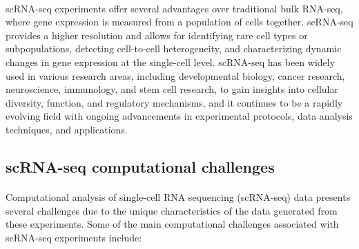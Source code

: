 \documentclass[12pt]{extarticle}
\begin{document}
\paragraph{} scRNA-seq experiments offer several advantages over traditional bulk RNA-seq, where gene expression is measured from a population of cells together. scRNA-seq provides a higher resolution and allows for identifying rare cell types or subpopulations, detecting cell-to-cell heterogeneity, and characterizing dynamic changes in gene expression at the single-cell level. scRNA-seq has been widely used in various research areas, including developmental biology, cancer research, neuroscience, immunology, and stem cell research, to gain insights into cellular diversity, function, and regulatory mechanisms, and it continues to be a rapidly evolving field with ongoing advancements in experimental protocols, data analysis techniques, and applications.

\subsection{scRNA-seq computational challenges \cite{stegle2015computational}}

\paragraph{} Computational analysis of single-cell RNA sequencing (scRNA-seq) data presents several challenges due to the unique characteristics of the data generated from these experiments. Some of the main computational challenges associated with scRNA-seq experiments include:
\end{document}
